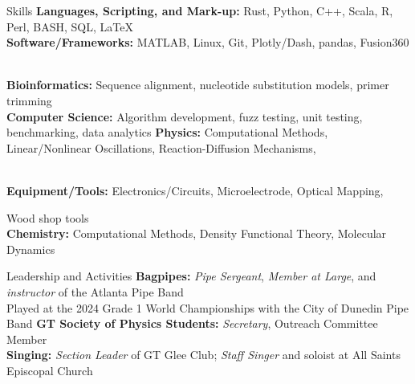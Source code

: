 \documentclass{resume} %
\begin{document}
\begin{rSection}{Skills}
  \textbf{Languages, Scripting, and Mark-up:} Rust, Python, C++, Scala, R, Perl, BASH, SQL, LaTeX \\
  \textbf{Software/Frameworks:} MATLAB, Linux, Git, Plotly/Dash, pandas, Fusion360 \\
  \textbf{Bioinformatics:} Sequence alignment, nucleotide substitution models, primer trimming \\
  \textbf{Computer Science:} Algorithm development, fuzz testing, unit testing, benchmarking, data analytics
  \textbf{Physics:} Computational Methods, Linear/Nonlinear Oscillations, Reaction-Diffusion Mechanisms,\\
  \textbf{Equipment/Tools:} Electronics/Circuits, Microelectrode, Optical Mapping, Wood shop tools\\
  \textbf{Chemistry:} Computational Methods, Density Functional Theory, Molecular Dynamics 
\end{rSection}
\begin{rSection}{Leadership and Activities}
  \textbf{Bagpipes:} \textit{Pipe Sergeant}, \textit{Member at Large}, and \textit{instructor} of the Atlanta Pipe Band \\
  \-\hspace{2cm} Played at the 2024 Grade 1 World Championships with the City of Dunedin Pipe Band
  \textbf{GT Society of Physics Students:} \textit{Secretary}, Outreach Committee Member \\
  \textbf{Singing:} \textit{Section Leader} of GT Glee Club; \textit{Staff Singer} and soloist at All Saints Episcopal Church  \\

\end{rSection}
\end{document}
